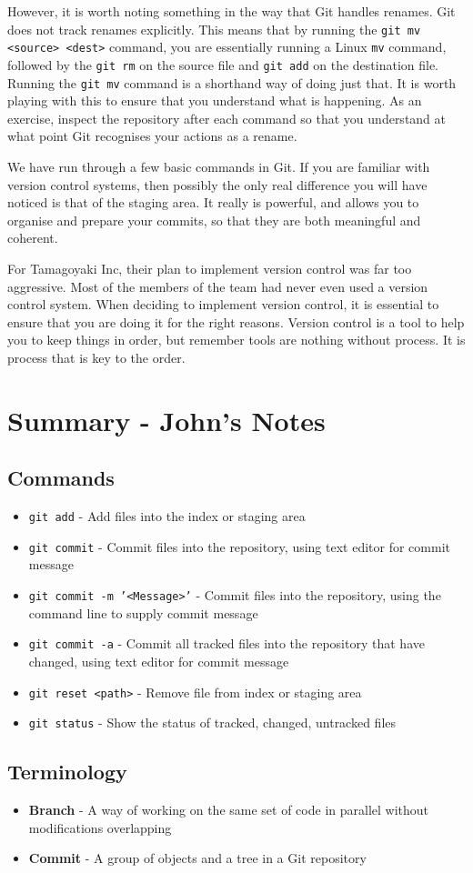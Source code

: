 However, it is worth noting something in the way that Git handles renames.
Git does not track renames explicitly.
This means that by running the \texttt{git mv <source> <dest>} command, you are essentially running a Linux \texttt{mv} command, followed by the \texttt{git rm} on the source file and \texttt{git add} on the destination file.
Running the \texttt{git mv} command is a shorthand way of doing just that.
It is worth playing with this to ensure that you understand what is happening.
As an exercise, inspect the repository after each command so that you understand at what point Git recognises your actions as a rename.

We have run through a few basic commands in Git.
If you are familiar with version control systems, then possibly the only real difference you will have noticed is that of the staging area.
It really is powerful, and allows you to organise and prepare your commits, so that they are both meaningful and coherent.

For Tamagoyaki Inc, their plan to implement version control was far too aggressive.
Most of the members of the team had never even used a version control system.
When deciding to implement version control, it is essential to ensure that you are doing it for the right reasons.
Version control is a tool to help you to keep things in order, but remember tools are nothing without process.
It is process that is key to the order.

\clearpage
\section{Summary - John's Notes}
\subsection{Commands}
\begin{itemize}
\item\texttt{git add} - Add files into the index or staging area
\item\texttt{git commit} - Commit files into the repository, using text editor for commit message
\item\texttt{git commit -m '<Message>'} - Commit files into the repository, using the command line to supply commit message
\item\texttt{git commit -a} - Commit all tracked files into the repository that have changed, using text editor for commit message
\item\texttt{git reset <path>} - Remove file from index or staging area
\item\texttt{git status} - Show the status of tracked, changed, untracked files
\end{itemize}

\subsection{Terminology}
\begin{itemize}
\item\textbf{Branch} - A way of working on the same set of code in parallel without modifications overlapping
\item\textbf{Commit} - A group of objects and a tree in a Git repository
\end{itemize}
